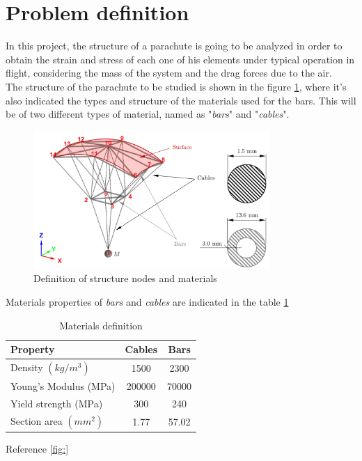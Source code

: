 \section{Problem definition}

In this project, the structure of a parachute is going to be analyzed in order
to obtain the strain and stress of each one of his elements under typical
operation in flight, considering the mass of the system and the drag forces
due to the air.\\

The structure of the parachute to be studied is shown in the figure \ref{fig:definition},
where it's also indicated the types and structure of the materials used for the
bars. This will be of two different types of material, named as "\textit{bars}" and
"\textit{cables}".\\

\begin{figure}[h]
	\centering
	\includegraphics[width=0.8\textwidth]{img/parachute_definition.png}
	\caption{Definition of structure nodes and materials}
	\label{fig:definition}
\end{figure}

Materials properties of \textit{bars} and \textit{cables} are indicated in the
table \ref{tab:materials}

\begin{table}[h]
\centering
\begin{tabular}{|p{6cm}|c|c|}
\hline
\textbf{Property}  	& \textbf{Cables} & \textbf{Bars} \\ \hline
Density $(kg/m^3)$	& 1500		& 2300  \\ \hline
Young's Modulus (MPa)	& 200000	& 70000 \\ \hline
Yield strength (MPa)	& 300		& 240   \\ \hline
Section area $(mm^2)$	& 1.77		& 57.02 \\ \hline
\end{tabular}
\caption{Materials definition}
\label{tab:materials}
\end{table}



Reference \ref{fig:}\\
